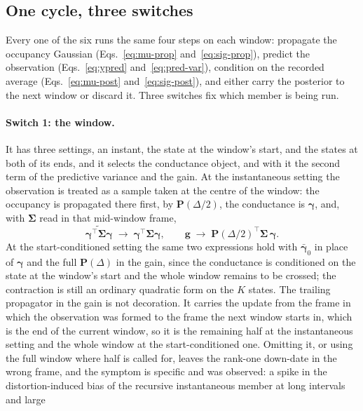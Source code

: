 \begin{appendixbox}
\subsection*{One cycle, three switches}

Every one of the six runs the same four steps on each window: propagate the occupancy
Gaussian (Eqs.~\ref{eq:mu-prop} and~\ref{eq:sig-prop}), predict the observation
(Eqs.~\ref{eq:ypred} and~\ref{eq:pred-var}), condition on the recorded average
(Eqs.~\ref{eq:mu-post} and~\ref{eq:sig-post}), and either carry the posterior to the next
window or discard it. Three switches fix which member is being run.

\paragraph{Switch 1: the window.} It has three settings, an instant, the state at the
window's start, and the states at both of its ends, and it selects the conductance object,
and with it the second term of the predictive variance and the gain. At the instantaneous
setting the observation is treated as a sample taken at the centre of
the window: the occupancy is propagated there first, by $\mathbf{P}(\Delta/2)$, the conductance
is $\boldsymbol{\gamma}$, and, with $\boldsymbol{\Sigma}$ read in that mid-window frame,
\begin{equation}
  \widetilde{\boldsymbol{\gamma}^\top\boldsymbol{\Sigma}\boldsymbol{\gamma}} \;\to\; \boldsymbol{\gamma}^\top\boldsymbol{\Sigma}\boldsymbol{\gamma},
  \qquad
  \mathbf{g} \;\to\; \mathbf{P}(\Delta/2)^\top\boldsymbol{\Sigma}\,\boldsymbol{\gamma}.
  \label{eq:av0}
\end{equation}
At the start-conditioned setting the same two expressions hold with $\bar{\boldsymbol{\gamma}}_0$ in
place of $\boldsymbol{\gamma}$ and the full $\mathbf{P}(\Delta)$ in the gain, since the conductance is
conditioned on the state at the window's start and the whole window remains to be crossed;
the contraction is still an ordinary quadratic form on the $K$ states.
The trailing propagator in the gain is not decoration. It carries the update from the frame in
which the observation was formed to the frame the next window starts in, which is the end of
the current window, so it is the remaining half at the instantaneous setting and the whole
window at the start-conditioned one. Omitting it, or using the full window where half is called for, leaves the
rank-one down-date in the wrong frame, and the symptom is specific and was observed: a spike in
the distortion-induced bias of the recursive instantaneous member at long intervals and large

\end{appendixbox}
